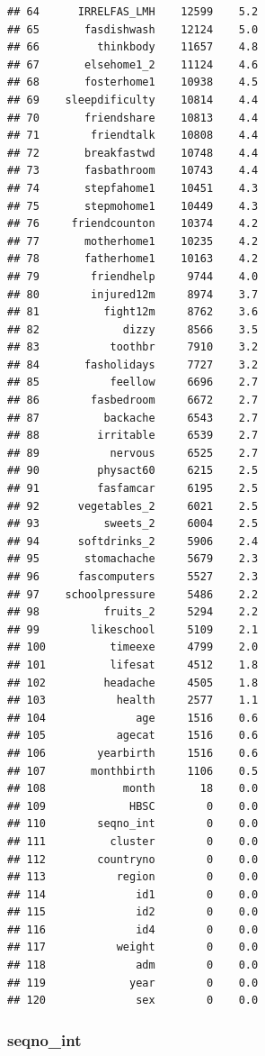 \documentclass[
]{article}
\begin{document}
\begin{verbatim}
## 64      IRRELFAS_LMH    12599    5.2
## 65       fasdishwash    12124    5.0
## 66         thinkbody    11657    4.8
## 67       elsehome1_2    11124    4.6
## 68       fosterhome1    10938    4.5
## 69    sleepdificulty    10814    4.4
## 70       friendshare    10813    4.4
## 71        friendtalk    10808    4.4
## 72       breakfastwd    10748    4.4
## 73       fasbathroom    10743    4.4
## 74       stepfahome1    10451    4.3
## 75       stepmohome1    10449    4.3
## 76     friendcounton    10374    4.2
## 77       motherhome1    10235    4.2
## 78       fatherhome1    10163    4.2
## 79        friendhelp     9744    4.0
## 80        injured12m     8974    3.7
## 81          fight12m     8762    3.6
## 82             dizzy     8566    3.5
## 83           toothbr     7910    3.2
## 84       fasholidays     7727    3.2
## 85           feellow     6696    2.7
## 86        fasbedroom     6672    2.7
## 87          backache     6543    2.7
## 88         irritable     6539    2.7
## 89           nervous     6525    2.7
## 90         physact60     6215    2.5
## 91         fasfamcar     6195    2.5
## 92      vegetables_2     6021    2.5
## 93          sweets_2     6004    2.5
## 94      softdrinks_2     5906    2.4
## 95       stomachache     5679    2.3
## 96      fascomputers     5527    2.3
## 97    schoolpressure     5486    2.2
## 98          fruits_2     5294    2.2
## 99        likeschool     5109    2.1
## 100          timeexe     4799    2.0
## 101          lifesat     4512    1.8
## 102         headache     4505    1.8
## 103           health     2577    1.1
## 104              age     1516    0.6
## 105           agecat     1516    0.6
## 106        yearbirth     1516    0.6
## 107       monthbirth     1106    0.5
## 108            month       18    0.0
## 109             HBSC        0    0.0
## 110        seqno_int        0    0.0
## 111          cluster        0    0.0
## 112        countryno        0    0.0
## 113           region        0    0.0
## 114              id1        0    0.0
## 115              id2        0    0.0
## 116              id4        0    0.0
## 117           weight        0    0.0
## 118              adm        0    0.0
## 119             year        0    0.0
## 120              sex        0    0.0
\end{verbatim}

\subsubsection{seqno\_int}\label{seqno_int}
\end{document}
